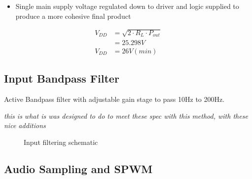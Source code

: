 \documentclass[11pt]{article}
\begin{document}
{\begin{itemize}
  \item Single main supply voltage regulated down to driver and logic supplied to produce a more cohesive final product
\end{itemize}

\begin{align*}
  V_{DD} &= \sqrt{2\cdot R_{L}\cdot P_{out}} \\
         &= 25.298V\\
  V_{DD} &= 26V (min)
\end{align*}


\subsection{Input Bandpass Filter}

Active Bandpass filter with adjustable gain stage to pass 10Hz to 200Hz.

\textit{this is what is was designed to do to meet these spec with this method, with these nice additions}

\begin{figure}[h!]
  \centering
  \caption{Input filtering schematic}
  \label{F:ipf_schem}
\end{figure}

\subsection{Audio Sampling and SPWM}

}
\end{document}
